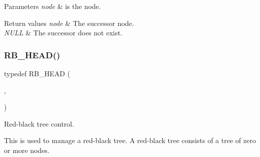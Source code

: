 \begin{DoxyParams}{Parameters}
{\em node} & is the node.\\
\hline
\end{DoxyParams}

\begin{DoxyRetVals}{Return values}
{\em node} & The successor node. \\
\hline
{\em N\+U\+LL} & The successor does not exist. \\
\hline
\end{DoxyRetVals}
\mbox{\label{group__RTEMSScoreRBTree_ga64d3e47d6fcda98acddb35fd53f28f26}} 
\subsubsection{\texorpdfstring{RB\_HEAD()}{RB\_HEAD()}}
{\footnotesize\ttfamily typedef R\+B\+\_\+\+H\+E\+AD (\begin{DoxyParamCaption}\item[{R\+B\+Tree\+\_\+\+Control}]{,  }\item[{\mbox{\hyperlink{structRBTree__Node}{R\+B\+Tree\+\_\+\+Node}}}]{ }\end{DoxyParamCaption})}



Red-\/black tree control. 

This is used to manage a red-\/black tree. A red-\/black tree consists of a tree of zero or more nodes. 